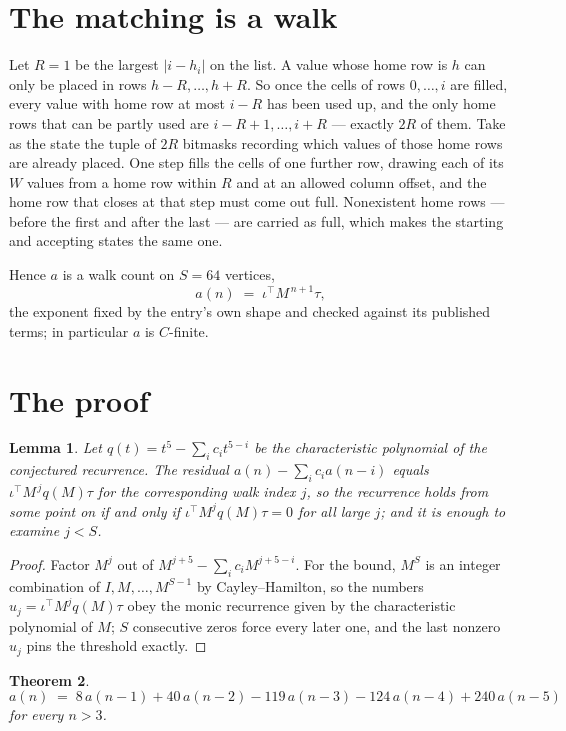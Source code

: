 \documentclass[11pt,a4paper]{article}
\theoremstyle{plain}
\newtheorem{theorem}{Theorem}
\newtheorem{lemma}[theorem]{Lemma}
\theoremstyle{definition}
\begin{document}
\section{The matching is a walk}

Let $R=1$ be the largest $|i-h_i|$ on the list. A value whose home row is $h$ can only be
placed in rows $h-R,\dots,h+R$. So once the cells of rows $0,\dots,i$ are filled, every
value with home row at most $i-R$ has been used up, and the only home rows that can be
partly used are $i-R+1,\dots,i+R$ --- exactly $2R$ of them. Take as the state the tuple of
$2R$ bitmasks recording which values of those home rows are already placed. One step fills
the cells of one further row, drawing each of its $W$ values from a home row within $R$
and at an allowed column offset, and the home row that closes at that step must come out
full. Nonexistent home rows --- before the first and after the last --- are carried as
full, which makes the starting and accepting states the same one.

Hence $a$ is a walk count on $S=64$ vertices,
\[
a(n)\;=\;\iota^{\!\top}M^{\,n+1}\tau ,
\]
the exponent fixed by the entry's own shape and checked against its published terms; in
particular $a$ is $C$-finite.

\section{The proof}

\begin{lemma}\label{lem:crit}
Let $q(t)=t^{5}-\sum_i c_it^{5-i}$ be the characteristic polynomial of the
conjectured recurrence. The residual $a(n)-\sum_ic_ia(n-i)$ equals
$\iota^{\!\top}M^{\,j}q(M)\tau$ for the corresponding walk index $j$, so the recurrence
holds from some point on if and only if $\iota^{\!\top}M^{j}q(M)\tau=0$ for all large $j$;
and it is enough to examine $j<S$.
\end{lemma}

\begin{proof}
Factor $M^{j}$ out of $M^{j+5}-\sum_ic_iM^{j+5-i}$. For the bound, $M^{S}$
is an integer combination of $I,M,\dots,M^{S-1}$ by Cayley--Hamilton, so the numbers
$u_j=\iota^{\!\top}M^{j}q(M)\tau$ obey the monic recurrence given by the characteristic
polynomial of $M$; $S$ consecutive zeros force every later one, and the last nonzero $u_j$
pins the threshold exactly.
\end{proof}

\begin{theorem}
\[
a(n)\;=\;8\,a(n-1) + 40\,a(n-2) - 119\,a(n-3) - 124\,a(n-4) + 240\,a(n-5)
\]
for every $n>3$.
\end{theorem}
\end{document}
